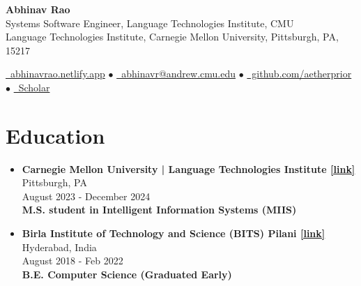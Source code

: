 \documentclass[11pt,letterpaper]{article}
\begin{document}
    
    \begin{center}
        {\Huge\bfseries Abhinav Rao}\\[2mm]
        {\large Systems Software Engineer, Language Technologies Institute, CMU}\\[1mm]
        {\small Language Technologies Institute, Carnegie Mellon University,
            Pittsburgh, PA, 15217}
    \end{center}
    
    \begin{center}
    \href{https://abhinavrao.netlify.app}{\faGlobe\ abhinavrao.netlify.app} $\bullet$ \href{mailto:abhinavr@andrew.cmu.edu}{\faEnvelope\ abhinavr@andrew.cmu.edu} $\bullet$ \href{https://github.com/aetherprior}{\faGithub\ github.com/aetherprior} $\bullet$ \href{https://scholar.google.com/citations?user=U_wk4ssAAAAJ}{\faGraduationCap\ Scholar}
    \end{center}
    
    \section*{Education}
    \begin{itemize}[leftmargin=*,label={},itemsep=4pt]
        \item \textbf{Carnegie Mellon University | Language Technologies Institute  \href{https://lti.cs.cmu.edu}{[link]}} \hfill Pittsburgh, PA\\
            August 2023 - December 2024\\
            \textbf{\textit{} M.S. student in Intelligent
                    Information Systems (MIIS)}
        \item \textbf{Birla Institute of Technology and Science (BITS) Pilani  \href{https://www.bits-pilani.ac.in/hyderabad/}{[link]}} \hfill Hyderabad, India\\
            August 2018 - Feb 2022\\
            \textbf{\textit{} B.E. Computer Science (Graduated
                    Early)}
    \end{itemize}
    
\end{document}
